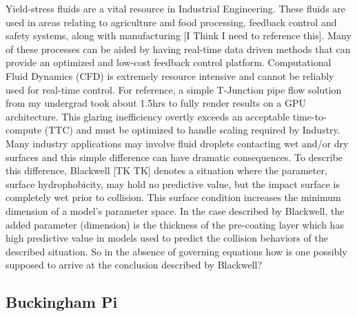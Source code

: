 \documentclass{article}
\theoremstyle{definition}
\begin{document}
Yield-stress fluids are a vital resource in Industrial Engineering. These fluids are used in areas relating to agriculture and food processing, feedback control and safety systems, along with manufacturing [I Think I need to reference this].  Many of these processes can be aided by having real-time data driven methods that can provide an optimized and low-cost feedback control platform. Computational Fluid Dynamics (CFD) is extremely resource intensive and cannot be reliably used for real-time control. For reference, a simple T-Junction pipe flow solution from my undergrad took about 1.5hrs to fully render results on a GPU architecture.  This glaring inefficiency overtly exceeds an acceptable time-to-compute (TTC) and must be optimized to handle scaling required by Industry. Many industry applications may involve fluid droplets contacting wet and/or dry surfaces and this simple difference can have dramatic consequences. To describe this difference, Blackwell [TK TK] denotes a situation where the parameter, surface hydrophobicity, may hold no predictive value, but the impact surface is completely wet prior to collision. This surface condition increases the minimum dimension of a model's parameter space. In the case described by Blackwell, the added parameter (dimension) is the thickness of the pre-coating layer which has high predictive value in models used to predict the collision behaviors of the described situation. So in the absence of governing equations how is one possibly supposed to arrive at the conclusion described by Blackwell? 

\subsection{Buckingham Pi}
    
\end{document}
